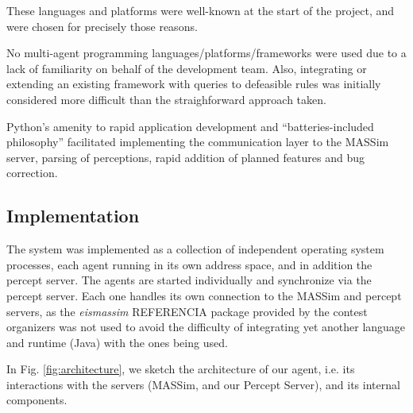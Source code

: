     These languages and platforms were well-known at the start of the project,
    and were chosen for precisely those reasons.
    
    No multi-agent programming languages/platforms/frameworks were used due to 
    a lack of familiarity on behalf of the development team. 
    Also, integrating or extending an existing framework with queries to
    defeasible rules was initially considered more difficult than the
    straighforward approach taken.

    Python's amenity to rapid application development and ``batteries-included 
    philosophy'' facilitated implementing the communication layer to the MASSim 
    server, parsing of perceptions, rapid addition of planned features and bug 
    correction.

\subsection{Implementation}
    The system was implemented as a collection of independent operating system
    processes, each agent running in its own address space, and in addition the
    percept server.
    The agents are started individually and synchronize via the percept server. 
    Each one handles its own connection to the MASSim and percept servers, as
    the \textit{eismassim} REFERENCIA package provided by the contest organizers
    was not used to avoid the difficulty of integrating yet another language and
    runtime (Java) with the ones being used. 
    
    

    In Fig. \ref{fig:architecture}, we sketch the architecture of our agent, 
    i.e. its interactions with the servers (MASSim, and our Percept Server), 
    and its internal components.

